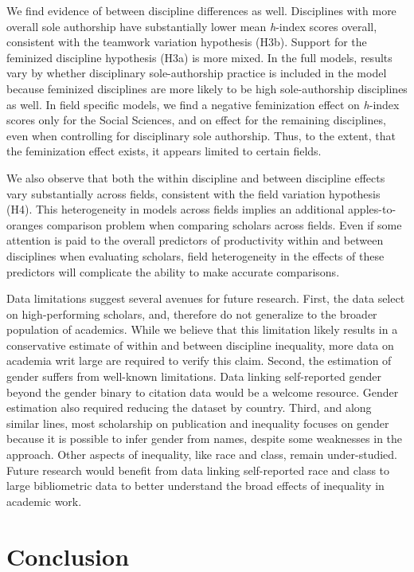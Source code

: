 \documentclass[
  10pt,
  letterpaper,
]{article}
\begin{document}
We find evidence of between discipline differences as well. Disciplines
with more overall sole authorship have substantially lower mean
\emph{h}-index scores overall, consistent with the teamwork variation
hypothesis (H3b). Support for the feminized discipline hypothesis (H3a)
is more mixed. In the full models, results vary by whether disciplinary
sole-authorship practice is included in the model because feminized
disciplines are more likely to be high sole-authorship disciplines as
well. In field specific models, we find a negative feminization effect
on \emph{h}-index scores only for the Social Sciences, and on effect for
the remaining disciplines, even when controlling for disciplinary sole
authorship. Thus, to the extent, that the feminization effect exists, it
appears limited to certain fields.

We also observe that both the within discipline and between discipline
effects vary substantially across fields, consistent with the field
variation hypothesis (H4). This heterogeneity in models across fields
implies an additional apples-to-oranges comparison problem when
comparing scholars across fields. Even if some attention is paid to the
overall predictors of productivity within and between disciplines when
evaluating scholars, field heterogeneity in the effects of these
predictors will complicate the ability to make accurate comparisons.

Data limitations suggest several avenues for future research. First, the
data select on high-performing scholars, and, therefore do not
generalize to the broader population of academics. While we believe that
this limitation likely results in a conservative estimate of within and
between discipline inequality, more data on academia writ large are
required to verify this claim. Second, the estimation of gender suffers
from well-known limitations. Data linking self-reported gender beyond
the gender binary to citation data would be a welcome resource. Gender
estimation also required reducing the dataset by country. Third, and
along similar lines, most scholarship on publication and inequality
focuses on gender because it is possible to infer gender from names,
despite some weaknesses in the approach. Other aspects of inequality,
like race and class, remain under-studied. Future research would benefit
from data linking self-reported race and class to large bibliometric
data to better understand the broad effects of inequality in academic
work.

\section{Conclusion}\label{conclusion}
\end{document}
